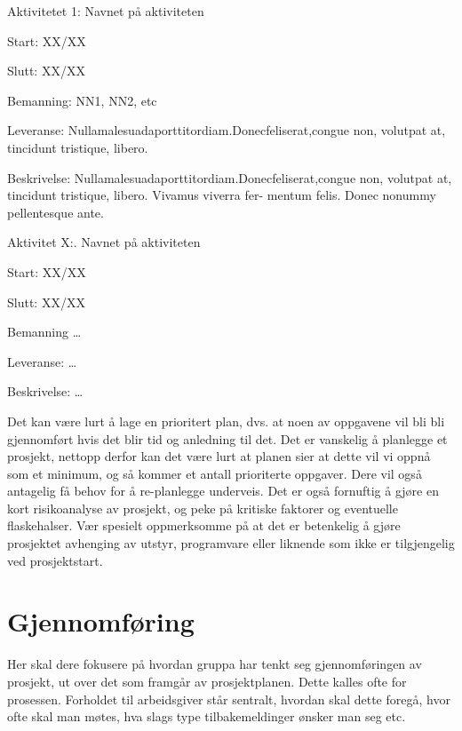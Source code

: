 \documentclass[11pt,a4paper]{report}
\begin{document}
\begin{compactdesc}
\item [Aktivitetet 1:] Navnet på aktiviteten
	\begin{compactitem}
	\item Start: XX/XX
	\item Slutt: XX/XX
	\item Bemanning: NN1, NN2, etc
	\item Leveranse: Nullamalesuadaporttitordiam.Donecfeliserat,congue
non, volutpat at, tincidunt tristique, libero. 
	\item Beskrivelse: Nullamalesuadaporttitordiam.Donecfeliserat,congue
non, volutpat at, tincidunt tristique, libero. Vivamus viverra fer- mentum felis. Donec nonummy pellentesque ante. 
	\end{compactitem}
	\item [Aktivitet X:.] Navnet på aktiviteten
	\begin{compactitem}
	\item Start: XX/XX
	\item Slutt: XX/XX
	\item Bemanning \dots
	\item Leveranse: \dots
	\item Beskrivelse: \dots
	\end{compactitem}

\end{compactdesc}


Det kan være lurt å lage en prioritert plan, dvs. at noen av oppgavene vil bli bli gjennomført hvis det blir tid og anledning til det. Det er vanskelig å planlegge et prosjekt, nettopp derfor kan det være lurt at planen sier at dette vil vi oppnå som et minimum, og så kommer et antall prioriterte oppgaver. Dere vil også antagelig få behov for å re-planlegge underveis.  Det er også fornuftig å gjøre en kort risikoanalyse av prosjekt, og peke på kritiske faktorer og eventuelle flaskehalser. Vær spesielt oppmerksomme på at det er betenkelig å gjøre prosjektet avhenging av utstyr, programvare eller liknende som ikke er tilgjengelig ved prosjektstart.

\section*{Gjennomføring}

Her skal dere  fokusere på hvordan gruppa har tenkt seg gjennomføringen av prosjekt, ut over det som framgår av prosjektplanen. Dette kalles ofte for prosessen. Forholdet til arbeidsgiver står sentralt, hvordan skal dette foregå, hvor ofte skal man møtes, hva slags type tilbakemeldinger ønsker man seg etc.
\end{document}
